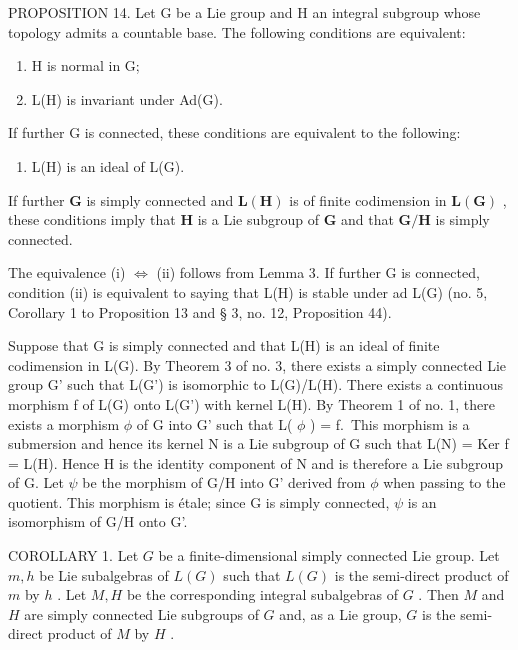 PROPOSITION 14. Let G be a Lie group and H an integral subgroup whose topology admits a countable base. The following conditions are equivalent:

\begin{enumerate}
\def\labelenumi{(\roman{enumi})}
\item
  H is normal in G;
\item
  L(H) is invariant under Ad(G).
\end{enumerate}

If further G is connected, these conditions are equivalent to the following:

\begin{enumerate}
\def\labelenumi{(\roman{enumi})}
\setcounter{enumi}{2}
\tightlist
\item
  L(H) is an ideal of L(G).
\end{enumerate}

If further \(\mathbf{G}\) is simply connected and \(\mathbf{L}(\mathbf{H})\) is of finite codimension in \(\mathbf{L}(\mathbf{G})\) , these conditions imply that \(\mathbf{H}\) is a Lie subgroup of \(\mathbf{G}\) and that \(\mathbf{G} / \mathbf{H}\) is simply connected.

The equivalence (i) \(\Leftrightarrow\) (ii) follows from Lemma 3. If further G is connected, condition (ii) is equivalent to saying that L(H) is stable under ad L(G) (no. 5, Corollary 1 to Proposition 13 and § 3, no. 12, Proposition 44).

Suppose that G is simply connected and that L(H) is an ideal of finite codimension in L(G). By Theorem 3 of no. 3, there exists a simply connected Lie group G' such that L(G') is isomorphic to L(G)/L(H). There exists a continuous morphism f of L(G) onto L(G') with kernel L(H). By Theorem 1 of no. 1, there exists a morphism \(\phi\) of G into G' such that L( \(\phi\) ) = f.~This morphism is a submersion and hence its kernel N is a Lie subgroup of G such that L(N) = Ker f = L(H). Hence H is the identity component of N and is therefore a Lie subgroup of G. Let \(\psi\) be the morphism of G/H into G' derived from \(\phi\) when passing to the quotient. This morphism is étale; since G is simply connected, \(\psi\) is an isomorphism of G/H onto G'.

COROLLARY 1. Let \(G\) be a finite-dimensional simply connected Lie group. Let \(m, h\) be Lie subalgebras of \(L(G)\) such that \(L(G)\) is the semi-direct product of \(m\) by \(h\) . Let \(M, H\) be the corresponding integral subalgebras of \(G\) . Then \(M\) and \(H\) are simply connected Lie subgroups of \(G\) and, as a Lie group, \(G\) is the semi-direct product of \(M\) by \(H\) .

